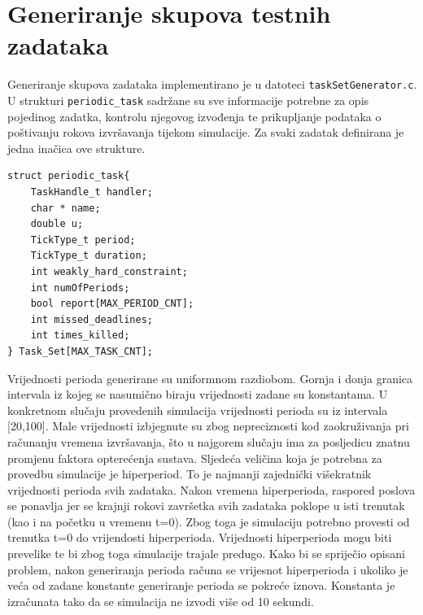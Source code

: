 \documentclass[../zavrsni.tex]{subfiles}
\begin{document}
\section{Generiranje skupova testnih zadataka}




Generiranje skupova zadataka implementirano je u datoteci \texttt{taskSetGenerator.c}. U strukturi \texttt{periodic\_task} sadržane su sve 
informacije potrebne za opis pojedinog zadatka, kontrolu njegovog izvođenja te prikupljanje podataka o poštivanju rokova 
izvršavanja tijekom simulacije. Za svaki zadatak definirana je jedna inačica ove strukture. 
\begin{lstlisting}[style=CStyle,caption={Struktura periodic\_task},captionpos=b]
struct periodic_task{
    TaskHandle_t handler;
    char * name;
    double u;
    TickType_t period;
    TickType_t duration;
    int weakly_hard_constraint;
    int numOfPeriods;
    bool report[MAX_PERIOD_CNT];
    int missed_deadlines;
    int times_killed;
} Task_Set[MAX_TASK_CNT];
\end{lstlisting}

Vrijednosti perioda generirane su uniformnom razdiobom. Gornja i donja granica intervala iz kojeg se nasumično biraju vrijednosti zadane su konstantama.
U konkretnom slučaju provedenih simulacija vrijednosti perioda su iz intervala [20,100]. Male vrijednosti izbjegnute su zbog nepreciznosti kod zaokruživanja pri
računanju vremena izvršavanja, što u najgorem slučaju ima za posljedicu znatnu promjenu faktora opterećenja sustava. 
Sljedeća veličina koja je potrebna za 
provedbu simulacije je hiperperiod. To je najmanji zajednički višekratnik vrijednosti perioda svih zadataka. Nakon vremena hiperperioda, raspored poslova 
se ponavlja jer se krajnji rokovi završetka svih zadataka poklope u isti trenutak (kao i na početku u vremenu t=0). Zbog toga je simulaciju potrebno provesti od trenutka t=0 do vrijendosti hiperperioda. 
Vrijednosti hiperperioda mogu biti prevelike te 
bi zbog toga simulacije trajale predugo. Kako bi se spriječio opisani problem, nakon generiranja perioda računa se vrijesnot hiperperioda i ukoliko je veća od zadane konstante
 generiranje perioda se pokreće iznova. Konstanta je izračunata tako da se simulacija ne izvodi više od 10 sekundi.
\end{document}
